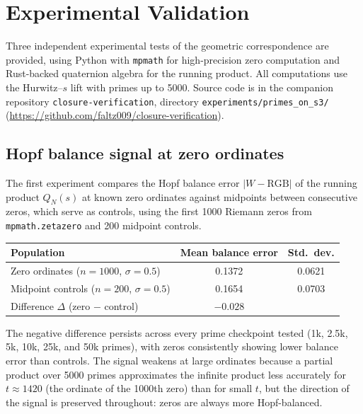 \documentclass[12pt,a4paper]{article}
\theoremstyle{definition}
\theoremstyle{remark}
\begin{document}
\section{Experimental Validation}
\label{sec:experiments}

Three independent experimental tests of the geometric correspondence are
provided, using Python with \texttt{mpmath} for high-precision zero
computation and Rust-backed quaternion algebra for the running product. All
computations use the Hurwitz--$s$ lift with primes up to 5000. Source
code is in the companion repository \texttt{closure-verification},
directory \texttt{experiments/primes\_on\_s3/}
(\url{https://github.com/faltz009/closure-verification}).

\subsection{Hopf balance signal at zero ordinates}

The first experiment compares the Hopf balance error $|W - \mathrm{RGB}|$ of
the running product $Q_N(s)$ at known zero ordinates against midpoints between
consecutive zeros, which serve as controls, using the first 1000 Riemann zeros
from \texttt{mpmath.zetazero} and 200 midpoint controls.

\begin{center}
\begin{tabular}{lcc}
\toprule
Population & Mean balance error & Std.\ dev. \\
\midrule
Zero ordinates ($n = 1000$, $\sigma = 0.5$) & 0.1372 & 0.0621 \\
Midpoint controls ($n = 200$, $\sigma = 0.5$) & 0.1654 & 0.0703 \\
\midrule
Difference $\Delta$ (zero $-$ control) & $-0.028$ & \\
\bottomrule
\end{tabular}
\end{center}

The negative difference persists across every prime checkpoint tested (1k,
2.5k, 5k, 10k, 25k, and 50k primes), with zeros consistently showing lower
balance error than controls. The signal weakens at large ordinates because a
partial product over 5000 primes approximates the infinite product less
accurately for $t \approx 1420$ (the ordinate of the 1000th zero) than for
small $t$, but the direction of the signal is preserved throughout:
zeros are always more Hopf-balanced.
\end{document}
